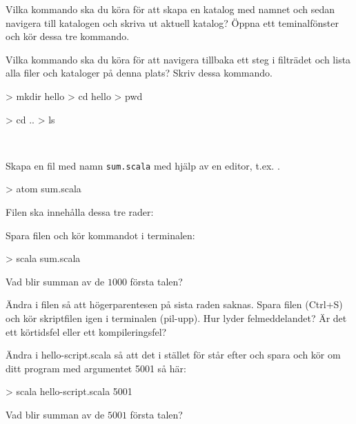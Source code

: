 \Subtask Vilka kommando ska du köra för att skapa en katalog med namnet  och sedan navigera till katalogen och skriva ut aktuell katalog? Öppna ett teminalfönster och kör dessa tre kommando.

\Subtask Vilka kommando ska du köra för att navigera tillbaka ett steg i filträdet och lista alla filer och kataloger på denna plats? Skriv dessa kommando.

\SOLUTION

\TaskSolved \what

\SubtaskSolved

\begin{REPL}
> mkdir hello
> cd hello
> pwd
\end{REPL}

\SubtaskSolved

\begin{REPL}
> cd ..
> ls
\end{REPL}


\QUESTEND










\QUESTBEGIN

\Task  \what~

\Subtask Skapa en fil med namn \texttt{sum.scala} med hjälp av en editor, t.ex. .
\begin{REPLnonum}
> atom sum.scala
\end{REPLnonum}

\noindent Filen ska innehålla dessa tre rader:

\noindent Spara filen och kör kommandot  i terminalen:
\begin{REPLnonum}
> scala sum.scala
\end{REPLnonum}

\noindent Vad blir summan av de $1000$ första talen?

\Subtask Ändra i filen  så att högerparentesen på sista raden saknas. Spara filen (Ctrl+S) och kör skriptfilen igen i terminalen (pil-upp). Hur lyder felmeddelandet? Är det ett körtidsfel eller ett kompileringsfel?

\Subtask Ändra i hello-script.scala så att det i stället för  står  efter  och spara och kör om ditt program med argumentet 5001 så här:
\begin{REPL}
> scala hello-script.scala 5001
\end{REPL}
\noindent Vad blir summan av de $5001$ första talen?

